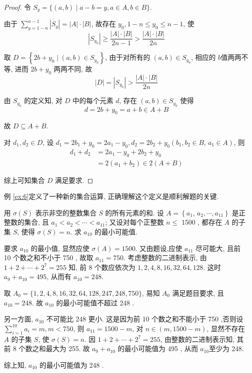 \begin{proof}
	令 $S_{y}=\{(a, b) \mid a-b=y, a \in A, b \in B\}$.

	由于 $\sum_{y=1-n}^{n-1}\left|S_{y}\right|=|A| \cdot|B|$, 故存在 $y_{0}, 1-n \leqslant y_{0} \leqslant n-1$, 使
	$$
		\left|S_{y_{0}}\right| \geqslant \frac{|A| \cdot|B|}{2 n-1}>\frac{|A| \cdot|B|}{2 n}
	$$

	取 $D=\left\{2 b+y_{0} \mid(a, b) \in S_{y_{0}}\right\}$, 由于对所有的 $(a, b) \in S_{y_{0}}$, 相应的 $b$值两两不等, 进而 $2 b+y_{0}$ 两两不同, 故
	$$
		|D|=\left|S_{y_{0}}\right|>\frac{|A| \cdot|B|}{2 n}
	$$

	由 $S_{y_{0}}$ 的定义知, 对 $D$ 中的每个元素 $d$, 存在 $(a, b) \in S_{y_{0}}$ 使得
	$$
		d=2 b+y_{0}=a+b \in A+B
	$$

	故 $D \subseteq A+B$.

	对 $d_{1}, d_{2} \in D$, 设 $d_{1}=2 b_{1}+y_{0}=2 a_{1}-y_{0}, d_{2}=2 b_{2}+y_{0}\left(b_{1}, b_{2} \in B\right.$, $\left.a_{1} \in A\right)$, 则
	$$
		\begin{aligned}
			d_{1}+d_{2} & =2 a_{1}-y_{0}+2 b_{2}+y_{0}          \\
			            & =2\left(a_{1}+b_{2}\right) \in 2(A+B)
		\end{aligned}
	$$

	综上可知集合 $D$ 满足要求.
\end{proof}

\begin{note}
	例 \ref{ex:6}定义了一种新的集合运算, 正确理解这个定义是顺利解题的关键.
\end{note}

\begin{example}
	用 $\sigma(S)$ 表示非空的整数集合 $S$ 的所有元素的和. 设 $A=\left\{a_{1}\right.$, $\left.a_{2}, \cdots, a_{11}\right\}$ 是正整数的集合, 且 $a_{1}<a_{2}<\cdots<a_{11}$; 又设对每个正整数 $n \leqslant$ 1500 , 都存在 $A$ 的子集 $S$, 使得 $\sigma(S)=n$. 求 $a_{10}$ 的最小可能值.
\end{example}

\begin{analysis}
	要求 $a_{10}$ 的最小值, 显然应使 $\sigma(A)=1500$. 又由题设,应使 $a_{11}$ 尽可能大, 且前 10 个数之和不小于 750 , 故取 $a_{11}=750$. 考虑整数的二进制表示, 由 $1+2+\cdots+2^{7}=255$ 知, 前 8 个数应依次为 $1 ,  2 ,  4 ,  8 ,  16 ,  32 ,  64 ,  128$. 这时 $a_{9}+a_{10}=495$, 从而有 $a_{10}=248$.
\end{analysis}

\begin{solution}
	取 $A_{0}=\{1,2,4,8,16,32,64,128,247,248,750\}$, 易知 $A_{0}$ 满足题目要求, 且 $a_{10}=248$. 故 $a_{10}$ 的最小可能值不超过 248 .

	另一方面, $a_{10}$ 不可能比 248 更小. 这是因为前 10 个数之和不能小于 750 ,否则设 $\sum_{i=1}^{10} a_{i}=m, m<750$, 则 $a_{11}=1500-m$, 对 $n \in(m, 1500-m)$, 显然不存在 $A$ 的子集 $S$, 使 $\sigma(S)=n$. 因 $1+2+\cdots+2^{7}=255$, 由整数的二进制表示知, 其前 8 个数之和最大为 255. 故 $a_{9}+a_{10}$ 的最小可能值为 495 , 从而 $a_{10}$至少为 248.

	综上知, $a_{10}$ 的最小可能值为 248 .
\end{solution}

